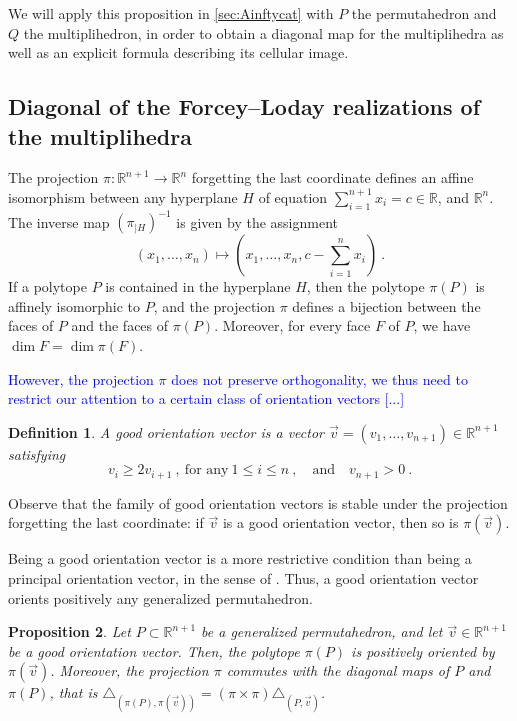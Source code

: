 \documentclass[twoside, 12pt]{amsart}
\newtheorem{definition}{Definition}[section]
\newtheorem{proposition}[definition]{Proposition}
\theoremstyle{remark}
\newcommand{\RR}{\mathbb{R}}
\newcommand{\Guillaume}[1]{\textcolor{blue}{#1}}
\begin{document}
We will apply this proposition in \cref{sec:Ainftycat} with $P$ the permutahedron and $Q$ the multiplihedron, in order to obtain a diagonal map for the multiplihedra as well as an explicit formula describing its cellular image.

\subsection{Diagonal of the Forcey--Loday realizations of the multiplihedra}
\label{sec:diagonal}

The projection $\pi : \RR^{n+1} \to \RR^n$ forgetting the last coordinate defines an affine isomorphism between any hyperplane $H$ of equation $\sum_{i=1}^{n+1} x_i = c \in \RR$, and $\RR^n$. 
The inverse map $(\pi_{| H})^{-1}$ is given by the assignment \[ (x_1, \ldots, x_n) \mapsto \left(x_1, \ldots, x_n, c- \sum_{i=1}^{n}x_i\right) \ . \]
If a polytope $P$ is contained in the hyperplane $H$, then the polytope $\pi(P)$ is affinely isomorphic to $P$, and the projection $\pi$ defines a bijection between the faces of $P$ and the faces of $\pi(P)$. Moreover, for every face $F$ of $P$, we have $\dim F = \dim \pi(F)$.

\Guillaume{However, the projection $\pi$ does not preserve orthogonality, we thus need to restrict our attention to a certain class of orientation vectors [...]}

\begin{definition} 
\label{def:goodvector}
A \emph{good orientation vector} is a vector $\vec v=(v_1, \ldots, v_{n+1})\in \RR^{n+1}$ satisfying \[v_{i}\geqslant2v_{i+1}\ , \ \text{for any}\  1\leqslant i\leqslant n\ , \quad \text{and}\quad  v_{n+1}>0 \ . \]
\end{definition}
Observe that the family of good orientation vectors is stable under the projection forgetting the last coordinate: if $\vec v$ is a good orientation vector, then so is $\pi(\vec v)$.

Being a good orientation vector is a more restrictive condition than being a principal orientation vector, in the sense of \cite[Definition 3.15]{LA21}. Thus, a good orientation vector orients positively any generalized permutahedron. 

\begin{proposition} 
\label{prop:goodprojection}
Let $P \subset \RR^{n+1}$ be a generalized permutahedron, and let $\vec v \in \RR^{n+1}$ be a good orientation vector. 
Then, the polytope $\pi(P)$ is positively oriented by $\pi(\vec v)$. 
Moreover, the projection $\pi$ commutes with the diagonal maps of $P$ and $\pi(P)$, that is $\triangle_{(\pi(P),\pi(\vec v))}=(\pi \times \pi)\triangle_{(P,\vec v)}$.
\end{proposition}
\end{document}
